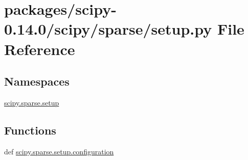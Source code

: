\hypertarget{packages_2scipy-0_814_80_2scipy_2sparse_2setup_8py}{}\section{packages/scipy-\/0.14.0/scipy/sparse/setup.py File Reference}
\label{packages_2scipy-0_814_80_2scipy_2sparse_2setup_8py}
\subsection*{Namespaces}
\begin{DoxyCompactItemize}
\item 
 \hyperlink{namespacescipy_1_1sparse_1_1setup}{scipy.\+sparse.\+setup}
\end{DoxyCompactItemize}
\subsection*{Functions}
\begin{DoxyCompactItemize}
\item 
def \hyperlink{namespacescipy_1_1sparse_1_1setup_a075776bfc340cb9095defa38d46a510e}{scipy.\+sparse.\+setup.\+configuration}
\end{DoxyCompactItemize}
